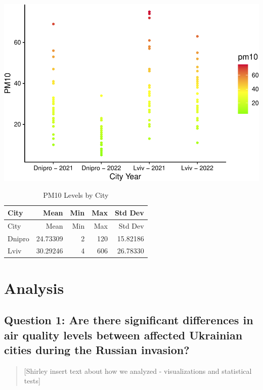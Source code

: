 \documentclass[
  12pt,
]{article}
\begin{document}
\includegraphics{Fontanie_Gordon_Weinberg_Project_files/figure-latex/plot of PM10 levels by CityYear-1.pdf}\\

\begin{longtable}[]{@{}lrrrr@{}}
\caption{PM10 Levels by City}\tabularnewline
\toprule
City & Mean & Min & Max & Std Dev \\
\midrule
\endfirsthead
\toprule
City & Mean & Min & Max & Std Dev \\
\midrule
\endhead
Dnipro & 24.73309 & 2 & 120 & 15.82186 \\
Lviv & 30.29246 & 4 & 606 & 26.78330 \\
\bottomrule
\end{longtable}

\newpage

\hypertarget{analysis}{%
\section{Analysis}\label{analysis}}

\hypertarget{question-1-are-there-significant-differences-in-air-quality-levels-between-affected-ukrainian-cities-during-the-russian-invasion}{%
\subsection{Question 1: Are there significant differences in air quality
levels between affected Ukrainian cities during the Russian
invasion?}\label{question-1-are-there-significant-differences-in-air-quality-levels-between-affected-ukrainian-cities-during-the-russian-invasion}}

\begin{quote}
{[}Shirley insert text about how we analyzed - visualizations and
statistical tests{]}
\end{quote}
\end{document}

